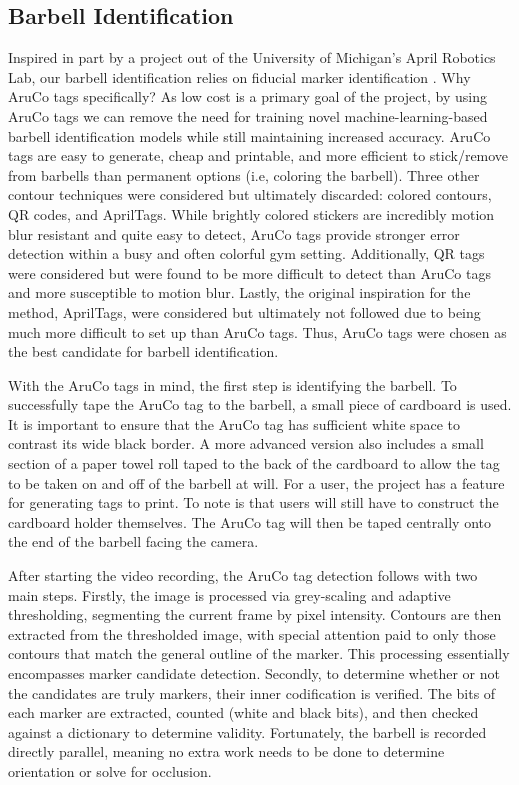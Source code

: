 \documentclass[10pt,twocolumn]{article}
\begin{document}
\subsection{Barbell Identification}
Inspired in part by a project out of the University of Michigan's April Robotics Lab, our barbell identification relies on fiducial marker identification \cite{Wang2016}. 
Why AruCo tags specifically? 
As low cost is a primary goal of the project, by using AruCo tags we can remove the need for training novel machine-learning-based barbell identification models while still maintaining increased accuracy. 
AruCo tags are easy to generate, cheap and printable, and more efficient to stick/remove from barbells than permanent options (i.e, coloring the barbell).
Three other contour techniques were considered but ultimately discarded: colored contours, QR codes, and AprilTags.
While brightly colored stickers are incredibly motion blur resistant and quite easy to detect, AruCo tags provide stronger error detection within a busy and often colorful gym setting.
Additionally, QR tags were considered but were found to be more difficult to detect than AruCo tags and more susceptible to motion blur.
Lastly, the original inspiration for the method, AprilTags, were considered but ultimately not followed due to being much more difficult to set up than AruCo tags.
Thus, AruCo tags were chosen as the best candidate for barbell identification. \par

With the AruCo tags in mind, the first step is identifying the barbell. 
To successfully tape the AruCo tag to the barbell, a small piece of cardboard is used.
It is important to ensure that the AruCo tag has sufficient white space to contrast its wide black border.
A more advanced version also includes a small section of a paper towel roll taped to the back of the cardboard to allow the tag to be taken on and off of the barbell at will.
For a user, the project has a feature for generating tags to print.
To note is that users will still have to construct the cardboard holder themselves.
The AruCo tag will then be taped centrally onto the end of the barbell facing the camera.\par

After starting the video recording, the AruCo tag detection follows with two main steps.
Firstly, the image is processed via grey-scaling and adaptive thresholding, segmenting the current frame by pixel intensity.
Contours are then extracted from the thresholded image, with special attention paid to only those contours that match the general outline of the marker.
This processing essentially encompasses marker candidate detection.
Secondly, to determine whether or not the candidates are truly markers, their inner codification is verified.
The bits of each marker are extracted, counted (white and black bits), and then checked against a dictionary to determine validity.
Fortunately, the barbell is recorded directly parallel, meaning no extra work needs to be done to determine orientation or solve for occlusion. \par
\end{document}
